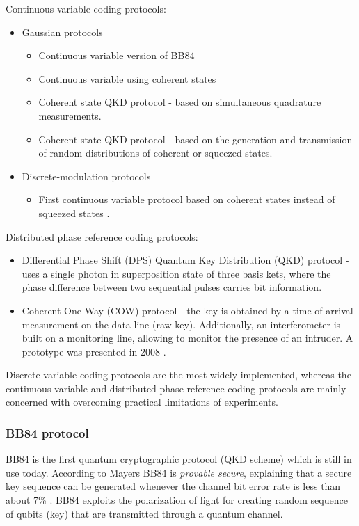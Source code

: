 \documentclass[conference, letterpaper]{IEEEtran}
\begin{document}
Continuous variable coding protocols:
\begin{itemize}
\item Gaussian protocols
\begin{itemize}
    \item Continuous variable version of BB84 \cite{cerf2001quantum}
    \item Continuous variable using coherent states \cite{grosshans2002continuous}
    \item Coherent state QKD protocol \cite{weedbrook2004quantum} - based on simultaneous quadrature measurements.
    \item Coherent state QKD protocol \cite{lodewyck2007quantum} - based on the generation and transmission of random distributions of coherent or squeezed states.
\end{itemize}
\item Discrete-modulation protocols
\begin{itemize}
\item First continuous variable protocol based on coherent states instead of squeezed states \cite{silberhorn2002continuous}.
\end{itemize}
\end{itemize}
Distributed phase reference coding protocols:
\begin{itemize}
\item Differential Phase Shift (DPS) Quantum Key Distribution (QKD) protocol \cite{inoue2002differential,inoue2003differential} - uses a single photon in superposition state of three basis kets, where the phase difference between two sequential pulses carries bit information.
\item Coherent One Way (COW) protocol \cite{gisin2004towards,stucki2005fast} - 
 the key is obtained by a time-of-arrival measurement on the data line (raw key). Additionally, an interferometer is built on a monitoring line, allowing to monitor the presence of an intruder. A prototype was presented in 2008 \cite{stucki2009continuous}.
\end{itemize}
Discrete variable coding protocols are the most widely implemented, whereas the continuous variable and distributed phase reference coding protocols are mainly concerned with overcoming practical limitations of experiments.

\subsubsection{BB84 protocol} \label{BB84}
BB84 is the first quantum cryptographic protocol (QKD scheme) which is still in use today. According to Mayers \cite{Mayers2001} BB84 is \textit{provable secure}, explaining that a secure key sequence can be generated whenever the channel bit error rate is less than about 7\% \cite{Branciard}. BB84 exploits the polarization of light for creating random sequence of qubits (key) that are transmitted through a quantum channel.
\end{document}
